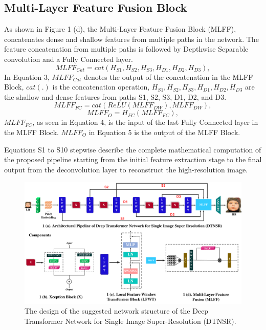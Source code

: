 \documentclass[journal]{IEEEtran}
\begin{document}
\subsection{Multi-Layer Feature Fusion Block}
As shown in Figure 1 (d), the Multi-Layer Feature Fusion Block (MLFF), concatenates dense and shallow features from multiple paths in the network. The feature concatenation from multiple paths is followed by Depthwise Separable convolution and a Fully Connected layer. 
\begin{equation}
{MLFF_{Cat}}= {cat}({H_{S1}},{H_{S2}},{H_{S3}},{H_{D1}},{H_{D2}},{H_{D3}}), 
\end{equation}
In Equation 3, ${MLFF_{Cat}}$ denotes the output of the concatenation in the MLFF Block, ${cat}$$(.)$ is the concatenation operation, ${H_{S1}},{H_{S2}},{H_{S3}},{H_{D1}},{H_{D2}},{H_{D3}}$ are the shallow and dense features from paths S1, S2, S3, D1, D2, and D3.
\begin{equation}
{MLFF_{FC}}= {cat}({ReLU}({MLFF_{DW}}), {MLFF_{DW}}),  
\end{equation}
\begin{equation}
{MLFF_{O}}= {H_{FC}}({MLFF_{FC}}), 
\end{equation}
${MLFF_{FC}}$, as seen in Equation 4, is the input of the last Fully Connected layer in the MLFF Block. ${MLFF_{O}}$ in Equation 5 is the output of the MLFF Block.

Equations S1 to S10 stepwise describe the complete mathematical computation of the proposed pipeline starting from the initial feature extraction stage to the final output from the deconvolution layer to reconstruct the high-resolution image.
\begin{figure}
    \centering

    \includegraphics[width=\linewidth]{1Figure.pdf}
    \caption{The design of the suggested network structure of the Deep Transformer Network for Single Image Super-Resolution (DTNSR).}
    \label{fig:2}
\end{figure}
\end{document}
